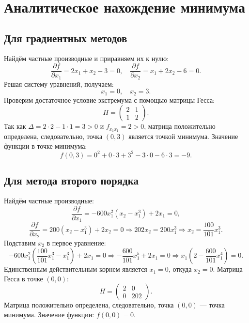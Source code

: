 \documentclass[12pt, letterpaper]{article}
\begin{document}
\section{Аналитическое нахождение минимума}
\subsection*{Для градиентных методов}
Найдём частные производные и приравняем их к нулю:
\[
\frac{\partial f}{\partial x_1} = 2x_1 + x_2 - 3 = 0, \quad
\frac{\partial f}{\partial x_2} = x_1 + 2x_2 - 6 = 0.
\]
Решая систему уравнений, получаем:
\[
x_1 = 0, \quad x_2 = 3.
\]
Проверим достаточное условие экстремума с помощью матрицы Гесса:
\[
H = \begin{pmatrix}
2 & 1  \\
1 & 2
\end{pmatrix}.
\]
Так как $\Delta = 2 \cdot 2 - 1 \cdot 1 = 3 > 0$ и $f_{x_1 x_1} = 2 > 0$, матрица положительно определена, следовательно, точка $(0, 3)$ является точкой минимума.
Значение функции в точке минимума:
\[
f(0, 3) = 0^2 + 0 \cdot 3 + 3^2 - 3 \cdot 0 - 6 \cdot 3 = -9.
\]

\subsection*{Для метода второго порядка}
Найдём частные производные:
\[
\frac{\partial f}{\partial x_1} = -600x_1^2(x_2 - x_1^3) + 2x_1 = 0,
\]
\[
\frac{\partial f}{\partial x_2} = 200(x_2 - x_1^3) + 2x_2 = 0 \Rightarrow 202x_2 = 200x_1^3 \Rightarrow x_2 = \frac{100}{101}x_1^3.
\]
Подставим $x_2$ в первое уравнение:
\[
-600x_1^2\left(\frac{100}{101}x_1^3 - x_1^3\right) + 2x_1 = 0 \Rightarrow -\frac{600}{101}x_1^5 + 2x_1 = 0 \Rightarrow x_1\left(2 - \frac{600}{101}x_1^4\right) = 0.
\]
Единственным действительным корнем является $x_1 = 0$, откуда $x_2 = 0$.
Матрица Гесса в точке $(0, 0)$:
\[
H = \begin{pmatrix} 2 & 0 \\ 0 & 202 \end{pmatrix}.
\]
Матрица положительно определена, следовательно, точка $(0, 0)$ --- точка минимума.
Значение функции: $f(0, 0) = 0$.
\end{document}
